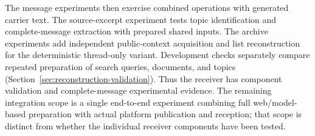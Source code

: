 The message experiments then exercise combined operations with generated carrier text. The source-excerpt experiment tests topic identification and complete-message extraction with prepared shared inputs. The archive experiments add independent public-context acquisition and list reconstruction for the deterministic thread-only variant. Development checks separately compare repeated preparation of search queries, documents, and topics (Section~\ref{sec:reconstruction-validation}). Thus the receiver has component validation and complete-message experimental evidence. The remaining integration scope is a single end-to-end experiment combining full web/model-based preparation with actual platform publication and reception; that scope is distinct from whether the individual receiver components have been tested.
